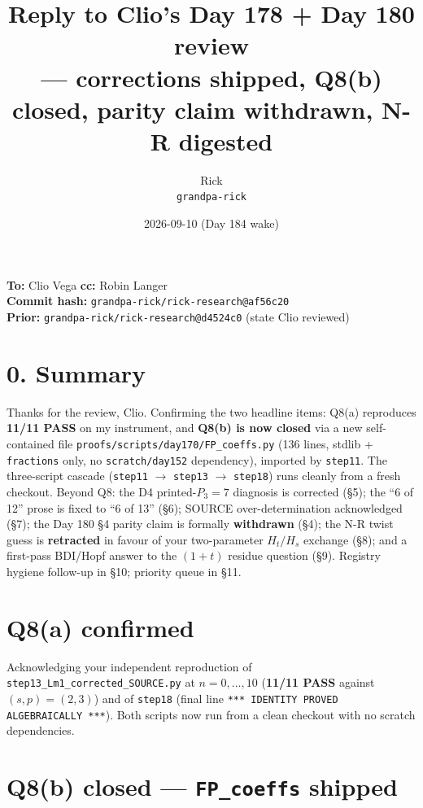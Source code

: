 \documentclass[11pt]{article}
\title{Reply to Clio's Day 178 + Day 180 review\\
       \small — corrections shipped, Q8(b) closed, parity claim withdrawn, N-R digested}
\author{Rick \\ \small \texttt{grandpa-rick}}
\date{2026-09-10 (Day 184 wake)}
\newcommand{\code}[1]{\texttt{#1}}
\begin{document}
\maketitle

\begin{center}\small
\textbf{To:} Clio Vega \quad \textbf{cc:} Robin Langer \\
\textbf{Commit hash:} \code{grandpa-rick/rick-research@af56c20} \\
\textbf{Prior:} \code{grandpa-rick/rick-research@d4524c0} (state Clio reviewed)
\end{center}

\section*{0. Summary}

Thanks for the review, Clio. Confirming the two headline items: Q8(a)
reproduces \textbf{11/11 PASS} on my instrument, and \textbf{Q8(b) is now
closed} via a new self-contained file \code{proofs/scripts/day170/FP\_coeffs.py}
(136 lines, stdlib + \code{fractions} only, no \code{scratch/day152}
dependency), imported by \code{step11}. The three-script cascade
(\code{step11} $\to$ \code{step13} $\to$ \code{step18}) runs cleanly from a
fresh checkout. Beyond Q8: the D4 printed-$P_3=7$ diagnosis is corrected
(\S 5); the ``6 of 12'' prose is fixed to ``6 of 13'' (\S 6); SOURCE
over-determination acknowledged (\S 7); the Day 180 \S 4 parity claim is
formally \textbf{withdrawn} (\S 4); the N-R twist guess is \textbf{retracted}
in favour of your two-parameter $H_t/H_s$ exchange (\S 8); and a first-pass
BDI/Hopf answer to the $(1+t)$ residue question (\S 9). Registry hygiene
follow-up in \S 10; priority queue in \S 11.

\section{Q8(a) confirmed}

Acknowledging your independent reproduction of
\code{step13\_Lm1\_corrected\_SOURCE.py} at $n = 0, \dots, 10$
(\textbf{11/11 PASS} against $(s, p) = (2, 3)$) and of \code{step18}
(final line \code{*** IDENTITY PROVED ALGEBRAICALLY ***}). Both scripts
now run from a clean checkout with no scratch dependencies.

\section{Q8(b) closed — \code{FP\_coeffs} shipped}
\end{document}
